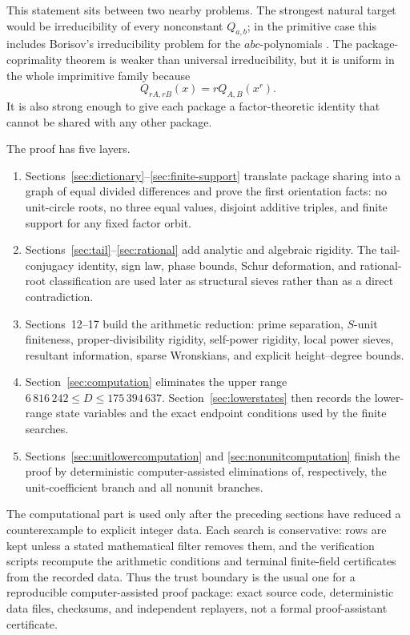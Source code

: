 \documentclass[11pt]{article}
\theoremstyle{definition}
\begin{document}
This statement sits between two nearby problems.  The strongest natural target
would be irreducibility of every nonconstant \(Q_{a,b}\); in the primitive
case this includes Borisov's irreducibility problem for the \(abc\)-polynomials
\cite{Borisov1998}.  The package-coprimality theorem is weaker than universal
irreducibility, but it is uniform in the whole imprimitive family because
\[
 Q_{rA,rB}(x)=rQ_{A,B}(x^r).
\]
It is also strong enough to give each package a factor-theoretic identity that
cannot be shared with any other package.

The proof has five layers.
\begin{enumerate}[label=(\arabic*)]
\item Sections~\ref{sec:dictionary}--\ref{sec:finite-support} translate
package sharing into a graph of equal divided differences and prove the first
orientation facts: no unit-circle roots, no three equal values, disjoint
additive triples, and finite support for any fixed factor orbit.
\item Sections~\ref{sec:tail}--\ref{sec:rational} add analytic and
algebraic rigidity.  The tail-conjugacy identity, sign law, phase bounds,
Schur deformation, and rational-root classification are used later as
structural sieves rather than as a direct contradiction.
\item Sections~12--17 build the arithmetic reduction: prime separation,
\(S\)-unit finiteness, proper-divisibility rigidity, self-power rigidity, local
power sieves, resultant information, sparse Wronskians, and explicit
height--degree bounds.
\item Section~\ref{sec:computation} eliminates the upper range
\(6\,816\,242\leq D\leq175\,394\,637\).  Section~\ref{sec:lowerstates}
then records the lower-range state variables and the exact endpoint conditions
used by the finite searches.
\item Sections~\ref{sec:unitlowercomputation} and
\ref{sec:nonunitcomputation} finish the proof by deterministic
computer-assisted eliminations of, respectively, the unit-coefficient branch
and all nonunit branches.
\end{enumerate}

The computational part is used only after the preceding sections have reduced
a counterexample to explicit integer data.  Each search is conservative: rows
are kept unless a stated mathematical filter removes them, and the verification
scripts recompute the arithmetic conditions and terminal finite-field
certificates from the recorded data.  Thus the trust boundary is the usual one
for a reproducible computer-assisted proof package: exact source code,
deterministic data files, checksums, and independent replayers, not a formal
proof-assistant certificate.
\end{document}
